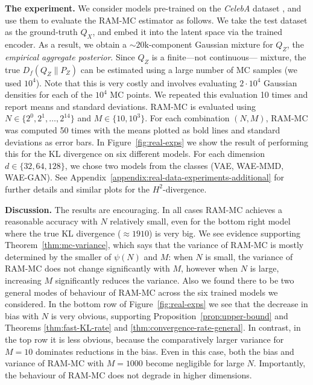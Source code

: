 \textbf{The experiment.}
We consider models pre-trained on the \emph{CelebA} dataset \cite{liu2015faceattributes}, 
and use them to evaluate the RAM-MC estimator as follows.
We take the test dataset as the ground-truth $Q_X$, and embed it into the latent space via the trained encoder.
As a result, we obtain a ${\sim}{20}\text{k}$-component Gaussian mixture for $Q_Z$, the \emph{empirical aggregate posterior}. 
Since $Q_Z$ is a finite---not continuous--- mixture, the true $D_f(Q_Z\|P_Z)$ can be estimated using a large number of MC samples (we used $10^4$).
Note that this is very costly and involves evaluating $2\cdot 10^4$ Gaussian densities for each of the $10^4$ MC points.
We repeated this evaluation 10 times and report means and standard deviations.
RAM-MC is evaluated using $N \in \{2^0, 2^1,\ldots, 2^{14}\}$ and $M \in \{10, 10^3\}$.
For each combination $(N,M)$, RAM-MC was computed 50 times with the means plotted as bold lines and standard deviations as error bars.
In Figure~\ref{fig:real-exps} we show the result of performing this for the KL divergence on six different models.
For each dimension $d\in\{32, 64, 128\}$, we chose two models from the classes (VAE, WAE-MMD, WAE-GAN). 
See Appendix~\ref{appendix:real-data-experiments-additional} for further details and similar plots for the $H^2$-divergence.

\textbf{Discussion.}
The results are encouraging. 
In all cases RAM-MC achieves a reasonable accuracy with $N$ relatively small, even for the bottom right model where the true KL divergence ($\approx 1910$) is very big.
We see evidence supporting Theorem~\ref{thm:mc-variance}, which says that the variance of RAM-MC is mostly determined by the smaller of $\psi(N)$ and $M$:
when $N$ is small, the variance of RAM-MC does not change significantly with $M$, 
however when $N$ is large, increasing $M$ significantly reduces the variance. 
Also we found there to be two general modes of behaviour of RAM-MC across the six trained models we considered. 
In the bottom row of Figure~\ref{fig:real-exps} we see that the decrease in bias with $N$ is very obvious, supporting Proposition~\ref{prop:upper-bound} and Theorems \ref{thm:fast-KL-rate} and \ref{thm:convergence-rate-general}.
In contrast, in the top row it is less obvious, because the comparatively larger variance for $M{=}10$ dominates reductions in the bias.
Even in this case, both the bias and variance of RAM-MC with $M{=}1000$ become negligible for large $N$.
Importantly, the behaviour of RAM-MC does not degrade in higher dimensions.


